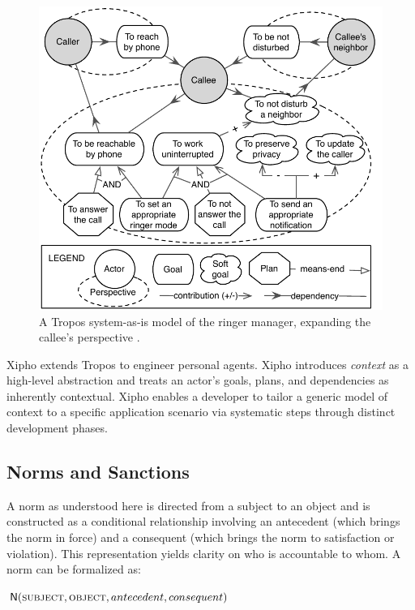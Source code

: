 \begin{figure}[!htb] \centering
\includegraphics[angle=0,width={0.60\columnwidth}]{Chapter-2/fig/ringer-manager-tropos-actor-model.pdf}
\caption[A Tropos model of the ringer manager]{A Tropos system-as-is model of the ringer manager, expanding the callee's perspective \protect\citep{Murukannaiah-AAMAS14-Xipho}.}
\label{fig:xipho-ringer-as-is} \end{figure}

Xipho \citep{Murukannaiah-AAMAS14-Xipho} extends Tropos to engineer
personal agents. Xipho introduces \emph{context} as a high-level
abstraction and treats an actor's goals, plans, and dependencies as
inherently contextual. Xipho enables a developer to tailor a generic
model of context to a specific application scenario via systematic steps
through distinct development phases.

\subsection{Norms and Sanctions}

A norm as understood here \citep{Singh-2013-Norms} is directed from a
subject to an object and is constructed as a conditional relationship
involving an antecedent (which brings the norm in force) and a
consequent (which brings the norm to satisfaction or violation). This
representation yields clarity on who is accountable to whom. A norm can
be formalized as:
%
\begin{center}
$\mathsf{N}(\textsc{subject},\textsc{object}, antecedent, consequent)$
\end{center}

